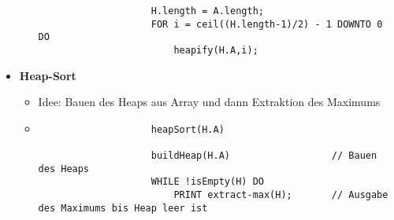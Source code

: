 \begin{itemize}
\begin{itemize}
\begin{verbatim}
                    H.length = A.length;
                    FOR i = ceil((H.length-1)/2) - 1 DOWNTO 0 DO
                        heapify(H.A,i);
                    \end{verbatim}
            \end{itemize}

        \item \textbf{Heap-Sort}
            \begin{itemize}
                \item Idee: Bauen des Heaps aus Array und dann Extraktion des Maximums
                \item[]
                    \begin{verbatim}
                    heapSort(H.A)

                    buildHeap(H.A)                  // Bauen des Heaps
                    WHILE !isEmpty(H) DO
                        PRINT extract-max(H);       // Ausgabe des Maximums bis Heap leer ist
                    \end{verbatim}
            \end{itemize}
    \end{itemize}

